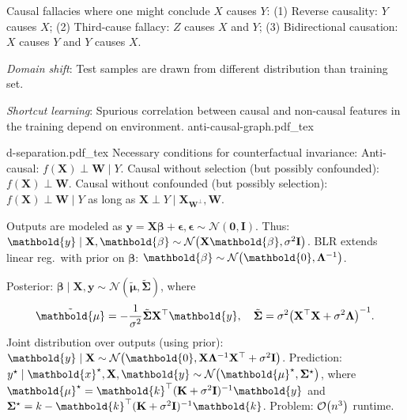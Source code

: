 \documentclass[9pt]{extarticle}
\newcommand{\incfig}[1]{
    \def\svgwidth{\columnwidth}
    {#1.pdf_tex}
}
\newenvironment{topic}[1]
{\textbf{\sffamily \colorbox{black}{\rlap{\textbf{\textcolor{white}{#1}}}\hspace{\linewidth}\hspace{-2\fboxsep}}}}
{}
\renewcommand{\mat}[1]{\ensuremath{\mathbf{#1}}}
\renewcommand{\vec}[1]{\ensuremath{\mathbold{#1}}}
\begin{document}
\begin{multicols*}{3}
\begin{topic}{Regression}
    \end{topic}

    \begin{topic}{Causality}
        Causal fallacies where one might conclude $X$ causes $Y$: (1) Reverse causality: $Y$ causes $X$;
        (2) Third-cause fallacy: $Z$ causes $X$ and $Y$; (3) Bidirectional causation: $X$ causes $Y$ and
        $Y$ causes $X$.

        \textit{Domain shift}: Test samples are drawn from different distribution than training set.

        \textit{Shortcut learning}: Spurious correlation between causal and non-causal features in the training
        depend on environment. \incfig{anti-causal-graph} \incfig{d-separation} Necessary conditions for
        counterfactual invariance: Anti-causal: $f(\mat{X}) \perp \mat{W} \mid Y$. Causal without selection
        (but possibly confounded): $f(\mat{X}) \perp \mat{W}$. Causal without confounded (but possibly
        selection): $f(\mat{X}) \perp \mat{W} \mid Y$ as long as $\mat{X} \perp Y \mid
            \mat{X}_{\mat{W}^{\perp}}, \mat{W}$.

    \end{topic}

    \begin{topic}{Gaussian processes}
        Outputs are modeled as $\vec{y} = \mat{X} \vec{\beta} + \vec{\epsilon}, \vec{\epsilon} \sim
            \mathcal{N}(\vec{0}, \mat{I})$. Thus: $\vec{y} \mid \mat{X}, \vec{\beta} \sim
            \mathcal{N}\lft(\mat{X} \vec{\beta}, \sigma^2 \mat{I}\rgt)$. BLR extends linear reg.\ with prior on
        $\vec{\beta}$: $\vec{\beta} \sim \mathcal{N}\lft(\vec{0}, \inv{\mat{\Lambda}}\rgt)$.

        Posterior: $\vec{\beta} \mid \mat{X}, \vec{y} \sim \mathcal{N}(\tilde{\vec{\mu}},
            \tilde{\mat{\Sigma}})$, where \[
            \tilde{\vec{\mu}} = -\frac{1}{\sigma^2} \tilde{\mat{\Sigma}} \transpose{\mat{X}} \vec{y}, \quad \tilde{\mat{\Sigma}} = \sigma^2 \inv{\lft( \transpose{\mat{X}} \mat{X} + \sigma^2 \mat{\Lambda} \rgt)}.
        \]
        Joint distribution over outputs (using prior): $\vec{y} \mid \mat{X} \sim \mathcal{N}\lft(\vec{0},
            \mat{X}\inv{\mat{\Lambda}} \transpose{\mat{X}} + \sigma^2 \mat{I}\rgt)$. Prediction: $y^\star \mid
            \vec{x}^\star, \mat{X}, \vec{y} \sim \mathcal{N} \lft( \vec{\mu}^\star, \mat{\Sigma}^\star \rgt)$,
        where $\vec{\mu}^\star = \transpose{\vec{k}} \inv{(\mat{K} + \sigma^2 \mat{I})} \vec{y}$ and
        $\mat{\Sigma}^\star = k - \transpose{\vec{k}} \inv{(\mat{K} + \sigma^2 \mat{I})} \vec{k}$. Problem:
        $\bigo{n^3}$ runtime.


\end{topic}
\end{multicols*}
\end{document}
